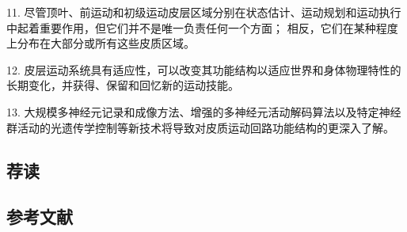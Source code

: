 11. 尽管顶叶、前运动和初级运动皮层区域分别在状态估计、运动规划和运动执行中起着重要作用，但它们并不是唯一负责任何一个方面； 相反，它们在某种程度上分布在大部分或所有这些皮质区域。

12. 皮层运动系统具有适应性，可以改变其功能结构以适应世界和身体物理特性的长期变化，并获得、保留和回忆新的运动技能。

13. 大规模多神经元记录和成像方法、增强的多神经元活动解码算法以及特定神经群活动的光遗传学控制等新技术将导致对皮质运动回路功能结构的更深入了解。

\subsection{荐读}
\subsection{参考文献}